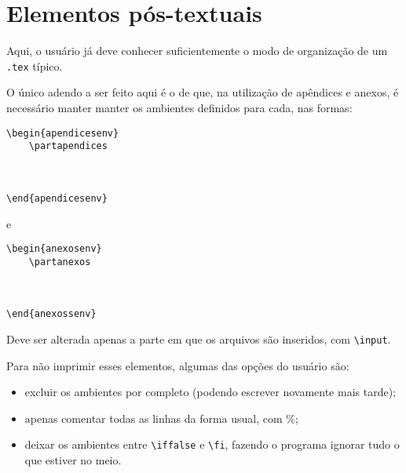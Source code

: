 \section{Elementos pós-textuais}
Aqui, o usuário já deve conhecer suficientemente o modo de organização de um \texttt{.tex} típico.

O único adendo a ser feito aqui é o de que, na utilização de apêndices e anexos, é necessário manter manter os ambientes definidos para cada, nas formas:

\begin{verbatim}
\begin{apendicesenv}
    \partapendices
    
    
    
\end{apendicesenv}
\end{verbatim}

e

\begin{verbatim}
\begin{anexosenv}
    \partanexos
    
    
    
\end{anexossenv}
\end{verbatim}

Deve ser alterada apenas a parte em que os arquivos são inseridos, com \texttt{\textbackslash input}.

Para não imprimir esses elementos, algumas das opções do usuário são:

\begin{itemize}
    \item excluir os ambientes por completo (podendo escrever novamente mais tarde);
    \item apenas comentar todas as linhas da forma usual, com \%;
    \item deixar os ambientes entre \texttt{\textbackslash iffalse} e \texttt{\textbackslash fi}, fazendo o programa ignorar tudo o que estiver no meio.
\end{itemize}